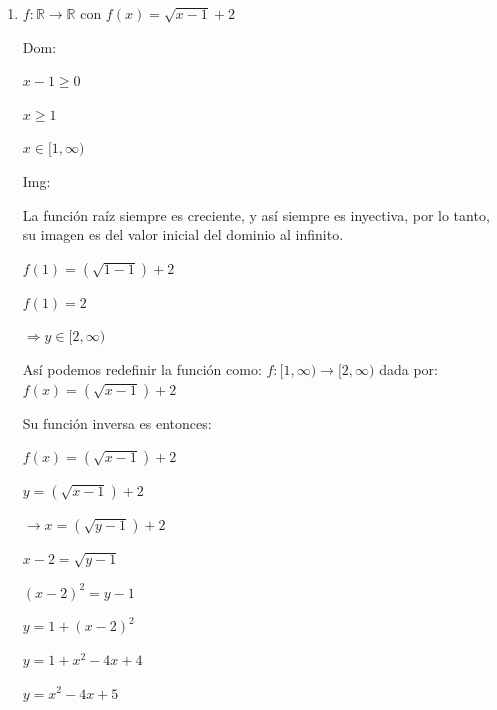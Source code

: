 \documentclass{article}
\begin{document}
\begin{enumerate}
\begin{enumerate}
        Así, la función \(f\) se define como:
        
        \(f : \mathbb{R} \setminus \left\{-\frac{5}{3}\right\} \rightarrow \mathbb{R} \setminus \left\{\frac{1}{3}\right\}\) dada por: \(f(x) = \frac{x}{3x + 5}\)
        \vspace{\baselineskip}
        
        \item[d)] \(f : \mathbb{R} \rightarrow \mathbb{R} \text{ con } f(x) = \sqrt{x - 1} + 2\)

        Dom:
        
        \(x - 1 \geq 0\)
        
        \(x \geq 1\)
        
        \(x \in [1, \infty)\)
        \vspace{\baselineskip}
        
        Img:
        
        La función raíz siempre es creciente, y así siempre es inyectiva, por lo tanto, su imagen es del valor inicial del dominio al infinito.
        
        \(f(1) = (\sqrt{1 - 1}) + 2\)
        
        \(f(1) = 2\)
        
        \(\Rightarrow y \in [2, \infty)\)
        \vspace{\baselineskip}
        
        Así podemos redefinir la función como:
        \(f : [1, \infty) \rightarrow [2, \infty)\) dada por: \(f(x) = (\sqrt{x - 1}) + 2\)
        \vspace{\baselineskip}
        
        Su función inversa es entonces:
        
        \(f(x) = (\sqrt{x - 1}) + 2\)
        
        \(y = (\sqrt{x - 1}) + 2\)
        \vspace{\baselineskip}
        
        \(\rightarrow x = (\sqrt{y - 1}) + 2\)
        
        \(x - 2 = \sqrt{y - 1}\)
        
        \((x - 2)^2 = y - 1\)
        
        \(y = 1 + (x - 2)^2\)
        
        \(y = 1 + x^2 - 4x + 4\)
        
        \(y = x^2 - 4x + 5\)
        \vspace{\baselineskip}
        

\end{enumerate}
\end{enumerate}
\end{document}
